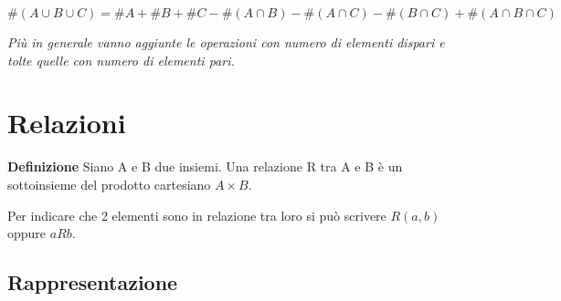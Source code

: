 \documentclass{article}
\begin{document}
$$\#(A \cup B \cup C) = \#A + \#B + \#C - \#(A \cap B) - \#(A \cap C) - \#(B \cap C) + \#(A \cap B \cap C)$$\newline

\vspace{-5pt}

\noindent \textit{Più in generale vanno aggiunte le operazioni con numero di elementi dispari e tolte quelle con numero di elementi pari.}

\section{Relazioni}

\textbf{Definizione}  Siano A e B due insiemi. Una relazione R tra A e B è un sottoinsieme del
prodotto cartesiano $A\times B$.\newline

\noindent Per indicare che 2 elementi sono in relazione tra loro si può scrivere $R(a,b)$ oppure $aRb$.

\subsection{Rappresentazione}
\end{document}
